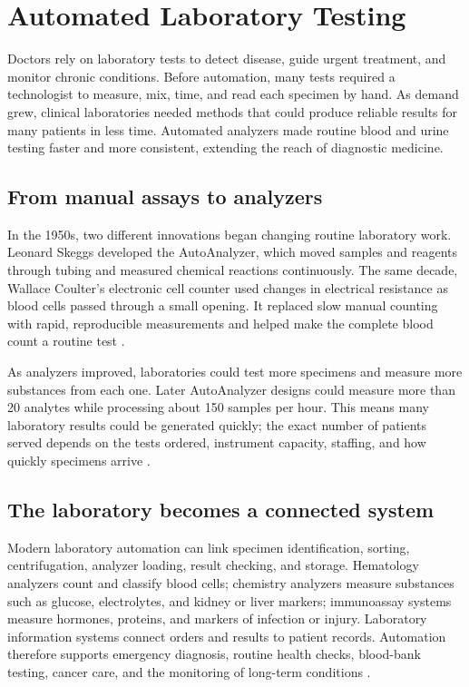 \documentclass[12pt,oneside]{book}
\begin{document}
\chapter[Automated Laboratory Testing]{Automated Laboratory Testing}

Doctors rely on laboratory tests to detect disease, guide urgent treatment,
and monitor chronic conditions. Before automation, many tests required a
technologist to measure, mix, time, and read each specimen by hand. As demand
grew, clinical laboratories needed methods that could produce reliable
results for many patients in less time. Automated analyzers made routine blood
and urine testing faster and more consistent, extending the reach of
diagnostic medicine.

\section{From manual assays to analyzers}
In the 1950s, two different innovations began changing routine laboratory
work. Leonard Skeggs developed the AutoAnalyzer, which moved samples and
reagents through tubing and measured chemical reactions continuously. The
same decade, Wallace Coulter's electronic cell counter used changes in
electrical resistance as blood cells passed through a small opening. It
replaced slow manual counting with rapid, reproducible measurements and
helped make the complete blood count a routine test \cite{armbrusterLabAutomation,greenCellCounters}.

As analyzers improved, laboratories could test more specimens and measure
more substances from each one. Later AutoAnalyzer designs could measure more
than 20 analytes while processing about 150 samples per hour. This means
many laboratory results could be generated quickly; the exact number of
patients served depends on the tests ordered, instrument capacity, staffing,
and how quickly specimens arrive \cite{armbrusterLabAutomation}.

\section{The laboratory becomes a connected system}
Modern laboratory automation can link specimen identification, sorting,
centrifugation, analyzer loading, result checking, and storage. Hematology
analyzers count and classify blood cells; chemistry analyzers measure
substances such as glucose, electrolytes, and kidney or liver markers;
immunoassay systems measure hormones, proteins, and markers of infection or
injury. Laboratory information systems connect orders and results to patient
records. Automation therefore supports emergency diagnosis, routine health
checks, blood-bank testing, cancer care, and the monitoring of long-term
conditions \cite{armbrusterLabAutomation,greenCellCounters}.
\end{document}
